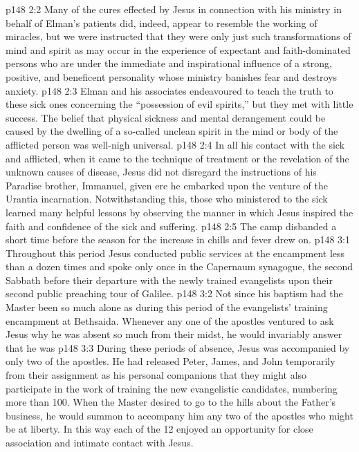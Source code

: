 \vs p148 2:2 Many of the cures effected by Jesus in connection with his ministry in behalf of Elman’s patients did, indeed, appear to resemble the working of miracles, but we were instructed that they were only just such transformations of mind and spirit as may occur in the experience of expectant and faith\hyp{}dominated persons who are under the immediate and inspirational influence of a strong, positive, and beneficent personality whose ministry banishes fear and destroys anxiety.
\vs p148 2:3 Elman and his associates endeavoured to teach the truth to these sick ones concerning the “possession of evil spirits,” but they met with little success. The belief that physical sickness and mental derangement could be caused by the dwelling of a so\hyp{}called unclean spirit in the mind or body of the afflicted person was well\hyp{}nigh universal.
\vs p148 2:4 In all his contact with the sick and afflicted, when it came to the technique of treatment or the revelation of the unknown causes of disease, Jesus did not disregard the instructions of his Paradise brother, Immanuel, given ere he embarked upon the venture of the Urantia incarnation. Notwithstanding this, those who ministered to the sick learned many helpful lessons by observing the manner in which Jesus inspired the faith and confidence of the sick and suffering.
\vs p148 2:5 The camp disbanded a short time before the season for the increase in chills and fever drew on.
\vs p148 3:1 Throughout this period Jesus conducted public services at the encampment less than a dozen times and spoke only once in the Capernaum synagogue, the second Sabbath before their departure with the newly trained evangelists upon their second public preaching tour of Galilee.
\vs p148 3:2 Not since his baptism had the Master been so much alone as during this period of the evangelists’ training encampment at Bethsaida. Whenever any one of the apostles ventured to ask Jesus why he was absent so much from their midst, he would invariably answer that he was 
\vs p148 3:3 During these periods of absence, Jesus was accompanied by only two of the apostles. He had released Peter, James, and John temporarily from their assignment as his personal companions that they might also participate in the work of training the new evangelistic candidates, numbering more than 100. When the Master desired to go to the hills about the Father’s business, he would summon to accompany him any two of the apostles who might be at liberty. In this way each of the 12 enjoyed an opportunity for close association and intimate contact with Jesus.
